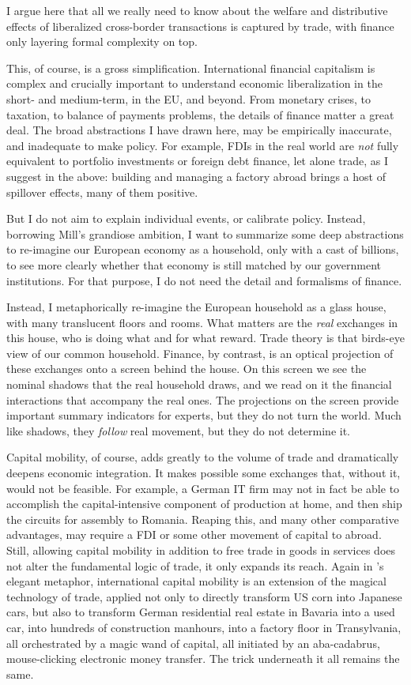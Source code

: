 I argue here that all we really need to know about the welfare and distributive effects of liberalized cross-border transactions is captured by trade, with finance only layering formal complexity on top.

This, of course, is a gross simplification.
International financial capitalism is complex and crucially important to understand economic liberalization in the short- and medium-term, in the \gls{EU}, and beyond.
From monetary crises, to taxation, to balance of payments problems, the details of finance matter a great deal.
The broad abstractions I have drawn here, may be empirically inaccurate, and inadequate to make policy.
For example, \glspl{FDI} in the real world are \emph{not} fully equivalent to portfolio investments or foreign debt finance, let alone trade, as I suggest in the above:
building and managing a factory abroad brings a host of spillover effects, many of them positive.

But I do not aim to explain individual events, or calibrate policy.
Instead, borrowing Mill's grandiose ambition, I want to summarize some deep abstractions to re-imagine our European economy as a household, only with a cast of billions, to see more clearly whether that economy is still matched by our government institutions.
For that purpose, I do not need the detail and formalisms of finance.

Instead, I metaphorically re-imagine the European household as a glass house, with many translucent floors and rooms.
What matters are the \emph{real} exchanges in this house, who is doing what and for what reward.
Trade theory is that birds-eye view of our common household.
Finance, by contrast, is an optical projection of these exchanges onto a screen behind the house.
On this screen we see the nominal shadows that the real household draws, and we read on it the financial interactions that accompany the real ones.
The projections on the screen provide important summary indicators for experts, but they do not turn the world.
Much like shadows, they \emph{follow} real movement, but they do not determine it.

Capital mobility, of course, adds greatly to the volume of trade and dramatically deepens economic integration.
It makes possible some exchanges that, without it, would not be feasible.
For example, a German IT firm may not in fact be able to accomplish the capital-intensive component of production at home, and then ship the circuits for assembly to Romania.
Reaping this, and many other comparative advantages, may require a \gls{FDI} or some other movement of capital to abroad.
Still, allowing capital mobility in addition to free trade in goods in services does not alter the fundamental logic of trade, it only expands its reach.
Again in \citeauthor{Mankiw-2004-aa}'s elegant metaphor, international capital mobility is an extension of the magical technology of trade, applied not only to directly transform US corn into Japanese cars, but also to transform German residential real estate in Bavaria into a used car, into hundreds of construction manhours, into a factory floor in Transylvania, all orchestrated by a magic wand of capital, all initiated by an aba-cadabrus, mouse-clicking electronic money transfer.
The trick underneath it all remains the same.

